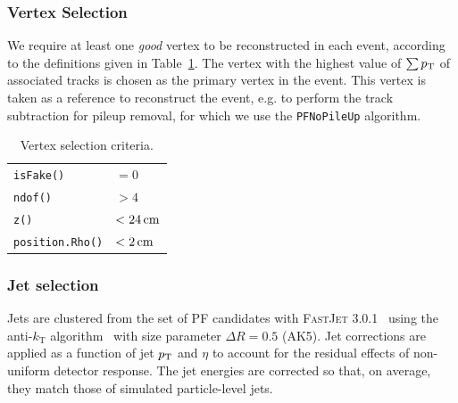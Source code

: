 
\subsubsection{Vertex Selection \label{sec:object_vertex}}

We require at least one {\it good} vertex to be reconstructed in each event, according to the
definitions given in Table~\ref{tab:object_vertex}.
The vertex with the highest value of $\sum p_{\mathrm{T}}$ of associated tracks is chosen as the primary vertex
in the event. This vertex is taken as a reference to reconstruct the event, e.g. to perform the
track subtraction for pileup removal, for which we use the {\tt PFNoPileUp} algorithm.

\begin{table}[htdp]
\caption{Vertex selection criteria. \label{tab:object_vertex}}
\begin{center}
\begin{tabular}{l l}
\toprule
\texttt{\small isFake()} & $= 0$ \\
\texttt{\small ndof()} & $> 4$ \\
\texttt{\small z()} & $< 24\,\text{cm}$ \\
\texttt{\small position.Rho()} & $< 2\,\text{cm}$ \\
\bottomrule
\end{tabular}
\end{center}
\end{table}


\subsubsection{Jet selection \label{sec:object_jets}}

Jets are clustered from the set of PF candidates with \textsc{FastJet 3.0.1}~\cite{Cacciari:2011ma}
using the anti-$k_\textrm{T}$ algorithm~\cite{antikt} with size parameter $\Delta R=0.5$ (AK5).  
Jet corrections are applied as a function of jet $p_{\mathrm{T}}$ and $\eta$ to account for the residual
effects of non-uniform detector response.  
The jet energies are corrected so that, on average, they match those of simulated particle-level
jets. 




